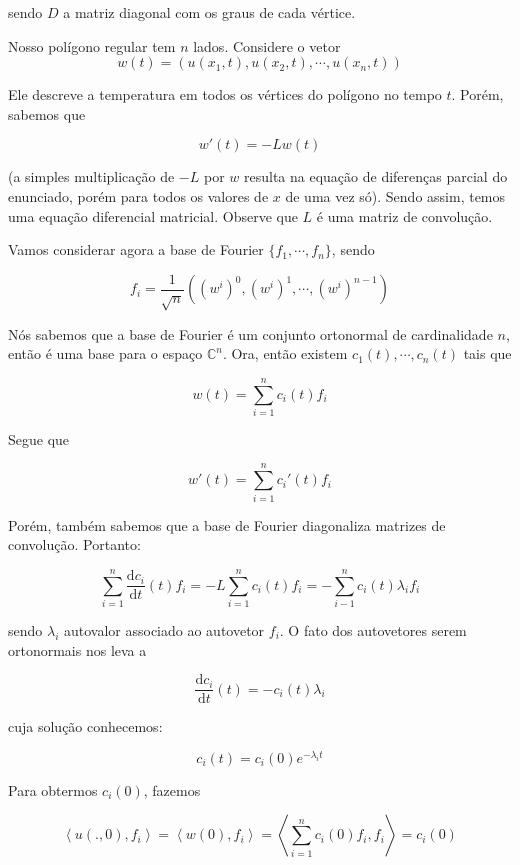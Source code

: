 \documentclass{article}
\begin{document}
\begin{enumerate}
                sendo $D$ a matriz diagonal com os graus de cada vértice.

                Nosso polígono regular tem $n$ lados. Considere o vetor $$w(t) = (u(x_1, t), u(x_2, t), \cdots, u(x_n, t))$$

                Ele descreve a temperatura em todos os vértices do polígono no tempo $t$.
                Porém, sabemos que

                $$w'(t) = -L w(t)$$

                (a simples multiplicação de $-L$ por $w$ resulta na equação de diferenças parcial do enunciado,
                porém para todos os valores de $x$ de uma vez só).
                Sendo assim, temos uma equação diferencial matricial.
                Observe que $L$ é uma matriz de convolução.
                
                Vamos considerar agora a base de Fourier $\{f_1, \cdots, f_n\}$, sendo

                $$f_i = \dfrac{1}{\sqrt{n}} \left((w^i)^0, (w^i)^1, \cdots, (w^i)^{n-1}\right)$$

                Nós sabemos que a base de Fourier é um conjunto ortonormal de cardinalidade $n$, então é uma base para o espaço
                $\mathbb{C}^n$. Ora, então existem $c_1(t), \cdots, c_n(t)$ tais que

                $$w(t) = \sum_{i=1}^n c_i(t)f_i$$

                Segue que

                $$w'(t) = \sum_{i=1}^n c_i'(t)f_i$$

                Porém, também sabemos que a base de Fourier diagonaliza matrizes de convolução. Portanto:

                $$\sum_{i=1}^n \dfrac{\mathrm{d}c_i}{\mathrm{d}t}(t)f_i = -L\sum_{i=1}^nc_i(t)f_i = -\sum_{i-1}^n c_i(t)\lambda_if_i$$

                sendo $\lambda_i$ autovalor associado ao autovetor $f_i$.
                O fato dos autovetores serem ortonormais nos leva a

                $$\dfrac{\mathrm{d}c_i}{\mathrm{d}t}(t) = -c_i(t)\lambda_i$$

                cuja solução conhecemos:

                $$c_i(t) = c_i(0) e^{-\lambda_i t}$$

                Para obtermos $c_i(0)$, fazemos

                $$\left<u(., 0), f_i\right> = \left<w(0), f_i\right> = \left<\sum_{i=1}^n c_i(0)f_i, f_i\right> = c_i(0)$$


\end{enumerate}
\end{document}
